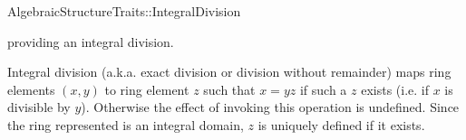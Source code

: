\begin{ccRefConcept}{AlgebraicStructureTraits::IntegralDivision}

\ccDefinition

 providing an integral division. 

Integral division (a.k.a. exact division or division without remainder) maps 
ring elements $(x,y)$ to ring element $z$ such that $x = yz$ if such a $z$ 
exists (i.e. if $x$ is divisible by $y$). Otherwise the effect of invoking 
this operation is undefined. Since the ring represented is an integral domain, 
$z$ is uniquely defined if it exists. 

\ccRefines 


\ccTypes

\ccGlue
{}\ccGlue
{}

\ccOperations
{}


\ccSeeAlso


\end{ccRefConcept} 
